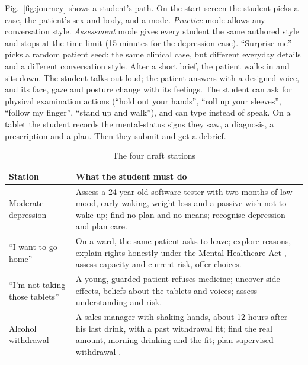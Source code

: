 \documentclass[journal]{IEEEtran}
\begin{document}
Fig.~\ref{fig:journey} shows a student's path. On the start screen the student picks a case, the patient's sex and body, and a mode. \emph{Practice} mode allows any conversation style. \emph{Assessment} mode gives every student the same authored style and stops at the time limit (15 minutes for the depression case). ``Surprise me'' picks a random patient seed: the same clinical case, but different everyday details and a different conversation
style. After a short brief, the patient walks in and sits down. The student talks out loud; the patient answers with a designed voice, and its face,
gaze and posture change with its feelings. The student can ask for physical examination actions (``hold out your hands'', ``roll up your sleeves'',
``follow my finger'', ``stand up and walk''), and can type instead of speak. On a tablet the student records the mental-status signs they saw, a
diagnosis, a prescription and a plan. Then they submit and get a debrief.

\begin{table}[t]
\caption{The four draft stations}
\label{tab:stations}
\centering
\scriptsize
\begin{tabularx}{\columnwidth}{@{}lY@{}}
\toprule
Station & What the student must do\\
\midrule
Moderate depression & Assess a 24-year-old software tester with two months of low mood, early waking, weight loss and a passive wish not to wake up; find no
plan and no means; recognise depression and plan care.\\
``I want to go home'' & On a ward, the same patient asks to leave; explore reasons, explain rights honestly under the Mental Healthcare Act
\cite{mhca2017}, assess capacity and current risk, offer choices.\\
``I'm not taking those tablets'' & A young, guarded patient refuses medicine; uncover side effects, beliefs about the tablets and voices; assess
understanding and risk.\\
Alcohol withdrawal & A sales manager with shaking hands, about 12 hours after his last drink, with a past withdrawal fit; find the real amount, morning
drinking and the fit; plan supervised withdrawal \cite{nice2010cg100}.\\
\bottomrule
\end{tabularx}
\end{table}
\end{document}
